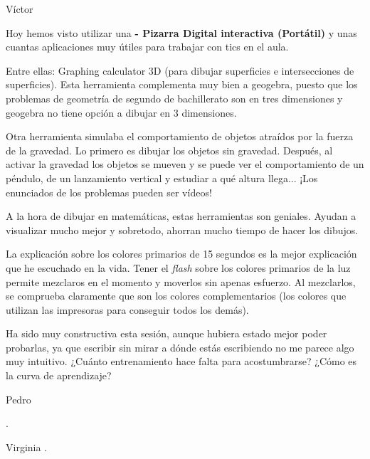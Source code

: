 \begin{opin}{\victorcolor}{Víctor}

Hoy hemos visto utilizar una \textbf{ - Pizarra Digital interactiva (Portátil)} y unas cuantas aplicaciones muy útiles para trabajar con tics en el aula.

Entre ellas: Graphing calculator 3D (para dibujar superficies e intersecciones de superficies).
%
Esta herramienta complementa muy bien a geogebra, puesto que los problemas de geometría de segundo de bachillerato son en tres dimensiones y geogebra no tiene opción a dibujar en 3 dimensiones.

Otra herramienta simulaba el comportamiento de objetos atraídos por la fuerza de la gravedad. 
%
Lo primero es dibujar los objetos sin gravedad. Después, al activar la gravedad los objetos se mueven y se puede ver el comportamiento de un péndulo, de un lanzamiento vertical y estudiar a qué altura llega... ¡Los enunciados de los problemas pueden ser vídeos!

A la hora de dibujar en matemáticas, estas herramientas son geniales. Ayudan a visualizar mucho mejor y sobretodo, ahorran mucho tiempo de hacer los dibujos.

La explicación sobre los colores primarios de 15 segundos es la mejor explicación que he escuchado en la vida. 
%
Tener el \textit{flash} sobre los colores primarios de la luz permite mezclaros en el momento y moverlos sin apenas esfuerzo. 
%
Al mezclarlos, se comprueba claramente que son los colores complementarios (los colores que utilizan las impresoras para conseguir todos los demás).

Ha sido muy constructiva esta sesión, aunque hubiera estado mejor poder probarlas, ya que escribir sin mirar a dónde estás escribiendo no me parece algo muy intuitivo. 
%
¿Cuánto entrenamiento hace falta para acostumbrarse?
%
¿Cómo es la curva de aprendizaje?


\end{opin}

\begin{opin}{\pedrocolor}{Pedro}

.


\end{opin}

\begin{opin}{\virgicolor}{Virginia}
.


\end{opin}
